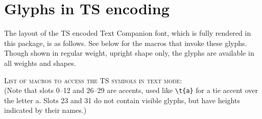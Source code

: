 \documentclass[11pt]{article}
\begin{document}
\section{Glyphs in TS encoding}
The layout of the TS encoded Text Companion font, which is fully rendered in this package, is as follows. See below for the macros that invoke these glyphs. Though shown in regular weight, upright shape only, the glyphs are available in all weights and shapes.


\textsc{List of macros to access the TS symbols in text mode:}\\
(Note that slots 0--12 and 26--29 are accents, used like \verb|\t{a}| for a tie accent over the letter a. Slots 23 and 31 do not contain visible glyphs, but have heights indicated by their names.)
\end{document}
